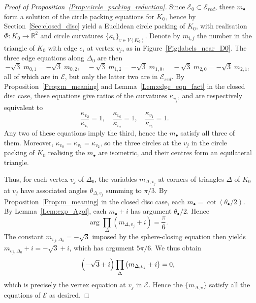 \documentclass[12pt]{amsart}
\numberwithin{equation}{section}
\theoremstyle{named}
\newcommand{\refsec}[1]{Section~\ref{Sec:#1}}
\newcommand{\reffig}[1]{Figure~\ref{Fig:#1}}
\newcommand{\reflem}[1]{Lemma~\ref{Lem:#1}}
\newcommand{\refprop}[1]{Proposition~\ref{Prop:#1}}
\let\Im\relax
\DeclareMathOperator{\Im}{Im}
\newcommand{\R}{\mathbb{R}}
\newcommand{\To}{\longrightarrow}
\begin{document}
\begin{proof}[Proof of \refprop{circle_packing_reduction}]
Since $\mathcal{E}_0 \subset \mathcal{E}_{red}$, these $m_\bullet$ form a solution of the circle packing equations for $K_0$, hence by \refsec{closed_disc} 
yield a Euclidean circle packing of $K_0$, with realisation $\Phi \colon K_0 \To \R^2$ and circle curvatures $\{\kappa_v\}_{v \in V(K_0)}$. Denote by $m_{i,j}$ the number in the triangle of $K_0$ with edge $e_i$ at vertex $v_j$, as in \reffig{labels_near_D0}. 
The three edge equations along $\Delta_0$ are then
\begin{equation}
\label{Eqn:edge_eqns_around_D0}
-\sqrt{3} \; m_{0,1} = - \sqrt{3} \; m_{0,2}, \quad
-\sqrt{3} \; m_{1,2} = - \sqrt{3} \; m_{1,0}, \quad
-\sqrt{3} \; m_{2,0} = - \sqrt{3} \; m_{2,1},
\end{equation}
all of which are in $\mathcal{E}$, but only the latter two are in $\mathcal{E}_{red}$. By \refprop{m_meaning} and \reflem{edge_eqn_fact} in the closed disc case, these equations give ratios of the curvatures $\kappa_{v_j}$, and are respectively equivalent to
\begin{equation}
\label{Eqn:curvatures_equal_around_D0}
\frac{\kappa_{v_2}}{\kappa_{v_1}} = 1, \quad
\frac{\kappa_{v_0}}{\kappa_{v_2}} = 1, \quad
\frac{\kappa_{v_1}}{\kappa_{v_0}} = 1. \quad
\end{equation}
Any two of these equations imply the third, hence the $m_\bullet$ satisfy all three of them. Moreover, $\kappa_{v_0} = \kappa_{v_1} = \kappa_{v_2}$, so the three circles at the $v_j$ in the circle packing of $K_0$ realising the $m_\bullet$ are isometric, and their centres form an equilateral triangle.

Thus, for each vertex $v_j$ of $\Delta_0$, the variables $m_{\Delta,v_j}$ at corners of triangles $\Delta$ of $K_0$ at $v_j$ have associated angles $\theta_{\Delta,v_j}$ summing to $\pi/3$. By \refprop{m_meaning} in the closed disc case, each $m_\bullet = \cot (\theta_\bullet/2)$. By \reflem{exp_Agol}, each $m_\bullet + i$ has argument $\theta_\bullet / 2$. Hence 
\[
\arg \prod_{\Delta} \left( m_{\Delta,v_j} + i \right) = \frac{\pi}{6}.
\]
The constant $m_{v_j,\Delta_0} = -\sqrt{3}$ imposed by the sphere-closing equation then yields $m_{v_j,\Delta_0} + i = - \sqrt{3} + i$, which has argument $5\pi/6$. We thus obtain
\[
\Im \left( - \sqrt{3} + i \right) \prod_{\Delta} \left( m_{\Delta,v_j} + i \right) = 0,
\]
which is precisely the vertex equation at $v_j$ in $\mathcal{E}$. Hence the $\{m_{\Delta,v}\}$ satisfy all the equations of $\mathcal{E}$ as desired.
\end{proof}
\end{document}

